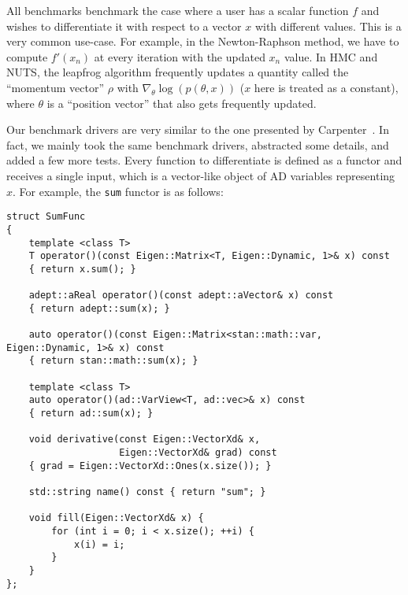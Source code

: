 All benchmarks benchmark the case where a user has a scalar function $f$ and 
wishes to differentiate it with respect to a vector $x$ with different values.
This is a very common use-case.
For example, in the Newton-Raphson method,
we have to compute $f'(x_n)$ at every iteration with the updated $x_n$ value.
In HMC and NUTS, the leapfrog algorithm frequently
updates a quantity called the ``momentum vector'' $\rho$ 
with $\nabla_\theta \log(p(\theta, x))$ ($x$ here is treated as a constant),
where $\theta$ is a ``position vector'' that also gets frequently updated.

Our benchmark drivers are very similar to the one presented by Carpenter~\cite{carpenter:2015}.
In fact, we mainly took the same benchmark drivers, abstracted some details, and added a few more tests.
Every function to differentiate is defined as a functor and receives a single input,
which is a vector-like object of AD variables representing $x$.
For example, the \verb|sum| functor is as follows:

\begin{lstlisting}[style=customcpp]
struct SumFunc
{
    template <class T>
    T operator()(const Eigen::Matrix<T, Eigen::Dynamic, 1>& x) const
    { return x.sum(); }

    adept::aReal operator()(const adept::aVector& x) const
    { return adept::sum(x); }

    auto operator()(const Eigen::Matrix<stan::math::var, Eigen::Dynamic, 1>& x) const
    { return stan::math::sum(x); }

    template <class T>
    auto operator()(ad::VarView<T, ad::vec>& x) const
    { return ad::sum(x); }

    void derivative(const Eigen::VectorXd& x,
                    Eigen::VectorXd& grad) const
    { grad = Eigen::VectorXd::Ones(x.size()); }

    std::string name() const { return "sum"; }

    void fill(Eigen::VectorXd& x) {
        for (int i = 0; i < x.size(); ++i) {
            x(i) = i;
        }
    }
};
\end{lstlisting}

